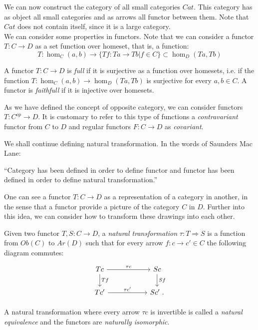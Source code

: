 We can now construct the category of all small categories $Cat$. This category has as object all small categories and as arrows all functor between them. Note that $Cat$ does not contain itself, since it is a large category.\\

We can consider some properties in functors. Note that we can consider a functor $T:C\to D$ as a set function over homeset, that is, a function: 
$$T:\hom_C(a,b) \to \{Tf: Ta \to Tb | f \in C\} \subset \hom_D(Ta,Tb)$$

\begin{definition}
  A functor $T:C\to D$ is \emph{full} if it is surjective as a function over homesets, i.e. if the function $T:\hom_C(a,b) \to  \hom_D(Ta,Tb)$  is surjective for every $a,b \in C$. A functor is \emph{faithfull} if it is injective over homesets.
\end{definition}

As we have defined the concept of opposite category, we can consider functors $T:C^{op} \to D$. It is customary to refer to this type of functions a \emph{contravariant} functor from $C$ to $D$ and regular functors $F:C\to D$ as \emph{covariant}.





We shall continue defining natural transformation. In the words of Saunders Mac Lane:

\begin{displayquote}
  ``Category has been defined in order to define functor and functor has been defined in order to define natural transformation.''
\end{displayquote}




One can see a functor $T:C\to D$ as a representation of a category in another, in the sense that a functor provide a picture of the category $C$ in $D$. Further into this idea, we can consider how to transform these drawings into each other. 

\begin{definition}
  Given two functor $T,S:C\to D$, a \emph{natural transformation} $\tau : T \Rightarrow S$ is a function from $Ob(C)$ to $Ar(D)$ such that for every arrow $f:c \to c' \in C$ the following diagram commutes:
  \[
    \begin{tikzpicture}
      \node {\begin{tikzcd}[column sep=20mm]
          Tc\ar[r,"\tau c"]\ar[d,"Tf"] & Sc\ar[d,"Sf"]\\
          Tc'\ar[r,"\tau c'"] & Sc'\ .
        \end{tikzcd}};
    \end{tikzpicture}
  \]

 A natural transformation where every arrow $\tau c$ is invertible is called a \emph{natural equivalence} and the functors are \emph{naturally isomorphic}.
\end{definition}



